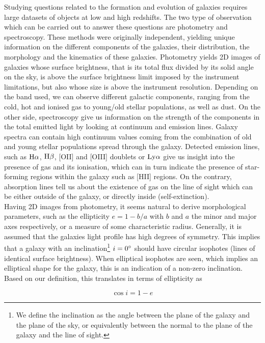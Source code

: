 Studying questions related to the formation and evolution of galaxies requires large datasets of objects at low and high redshifts. The two type of observation which can be carried out to answer these questions are photometry and spectroscopy. These methods were originally independent, yielding unique information on the different components of the galaxies, their distribution, the morphology and the kinematics of these galaxies.
Photometry yields 2D images of galaxies whose surface brightness, that is its total flux divided by its solid angle on the sky, is above the surface brightness limit imposed by the instrument limitations, but also whose size is above the instrument resolution. Depending on the band used, we can observe different galactic components, ranging from the cold, hot and ionised gas to young/old stellar populations, as well as dust.
On the other side, spectroscopy give us information on the strength of the components in the total emitted light by looking at continuum and emission lines. Galaxy spectra can contain high continuum values coming from the combination of old and young stellar populations spread through the galaxy. Detected emission lines, such as $\rm{H}{\alpha}$, $\rm{H}{\beta}$, [OII] and [OIII] doublets or $\rm{Ly}\alpha$ give us insight into the presence of gas and its ionisation, which can in turn indicate the presence of star-forming regions within the galaxy such as [HII] regions. On the contrary, absorption lines tell us about the existence of gas on the line of sight which can be either outside of the galaxy, or directly inside (self-extinction). \\
      
Having 2D images from photometry, it seems natural to derive morphological parameters, such as the ellipticity $e = 1 - b/a$ with $b$ and $a$ the minor and major axes respectively, or a measure of some characteristic radius. Generally, it is assumed that the galaxies light profile has high degrees of symmetry. This implies that a galaxy with an inclination\footnote{We define the inclination as the angle between the plane of the galaxy and the plane of the sky, or equivalently between the normal to the plane of the galaxy and the line of sight.} $i = 0 \degree$ should have circular isophotes (lines of identical surface brightness). When elliptical isophotes are seen, which implies an elliptical shape for the galaxy, this is an indication of a non-zero inclination. Based on our definition, this translates in terms of ellipticity as

\begin{equation}
	\cos i = 1 - e
	\label{eq:inclinaison}
\end{equation}

